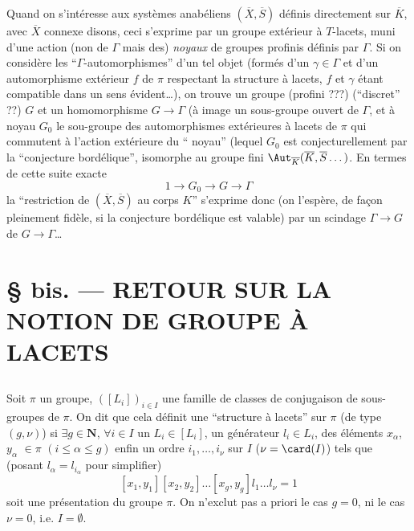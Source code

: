 Quand on s'intéresse aux systèmes anabéliens $(\overline{X}, \overline{S})$ définis directement sur $\overline{K}$, avec $\overline{X}$ connexe disons, ceci s'exprime par un groupe extérieur à $T$-lacets, muni d'une action (non de $\Gamma$ mais des) \emph{noyaux} de groupes profinis définis par $\Gamma$. Si on considère les ``$\Gamma$-automorphismes'' d'un tel objet (formés d'un $\gamma \in \Gamma$ et d'un automorphisme extérieur $f$ de $\pi$ respectant la structure à lacets, $f$ et $\gamma$ étant compatible dans un sens évident\dots), on trouve un groupe (profini ???) (``discret'' ??) $G$ et un homomorphisme $G \to \Gamma$ (à image un sous-groupe ouvert de $\Gamma$, et à noyau $G_0$ le sou-groupe des automorphismes extérieures à lacets de $\pi$ qui commutent à l'action extérieure du ``  noyau'' (lequel $G_0$ est conjecturellement par la ``conjecture bordélique'', isomorphe au groupe fini $\Aut_{\overline{K}}(\overline{K}, \overline{S}\dots)$. En termes de cette suite exacte
$$
1 \to G_0 \to G \to \Gamma
$$
la ``restriction de $(\overline{X}, \overline{S})$ au corps $K$'' s'exprime donc (on l'espère, de fa\c{c}on pleinement fidèle, si la conjecture bordélique est valable) par un scindage $\Gamma \to G$ de $G \to \Gamma$\dots














\chapter*{\S {} bis. --- RETOUR SUR LA NOTION DE GROUPE À LACETS}\thispagestyle{empty}
\label{sec:13bis}
\section*{}

Soit $\pi$ un groupe, $([L_i])_{i \in I}$ une famille de classes de conjugaison de sous-groupes de $\pi$. On dit que cela définit une ``structure à lacets'' sur $\pi$ (de type $(g, \nu)$) si $\exists g \in \mathbf{N}$, $\forall i \in I$ un $L_i \in [L_i]$, un générateur $l_i \in L_i$, des éléments $x_\alpha$, $y_\alpha$ $\in \pi$ $(i \leq \alpha \leq g)$ enfin un ordre $i_1, \dots, i_\nu$ sur $I$ ($\nu = \card (I)$) tels que (posant $l_\alpha = l_{i_\alpha}$ pour simplifier)
$$
[x_1, y_1][x_2, y_2] \dots [x_g, y_g]l_1 \dots l_\nu = 1
$$
soit une présentation du groupe $\pi$. On n'exclut pas a priori le cas $g = 0$, ni le cas $\nu = 0$, i.e. $I = \emptyset$.

